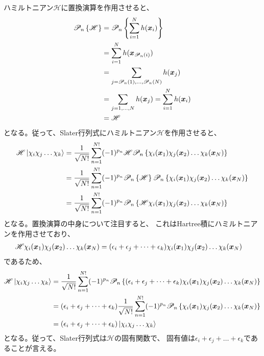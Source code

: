ハミルトニアン$\mathscr{H}$に置換演算を作用させると、
\begin{align}
	\mathscr{P}_n\left\{
		\mathscr{H}
	\right\}
&=
	\mathscr{P}_n\left\{
		\sum_{i=1}^{N} h(\x_i)
	\right\} \\
%
%
&=
	\sum_{i=1}^{N} h(\x_{\mathscr{P}_n(i)}) \\
%
%
&=
	\sum_{j=\mathscr{P}_n(1),\dots,\mathscr{P}_n(N)} h(\x_j) \\
%
%
&=
	\sum_{j=1,\dots,N} h(\x_j)
%
%
=
	\sum_{i=1}^{N} h(\x_i) \\
%
%
&=
	\mathscr{H}
\end{align}
となる。従って、Slater行列式にハミルトニアン$\mathscr{H}$を作用させると、
\begin{align}
	\mathscr{H}\ket{\chi_i\chi_j\dots\chi_k}
&=
	\frac{1}{\sqrt{N!}}
	\sum_{n=1}^{N!}
		(-1)^{p_n}
		\mathscr{H}
		\mathscr{P}_n\left\{
			\chi_i(\x_1) \chi_j(\x_2) \dots \chi_k(\x_N)
		\right\} \\
%
%
&=
	\frac{1}{\sqrt{N!}}
	\sum_{n=1}^{N!}
		(-1)^{p_n}
		\mathscr{P}_n\left\{
			\mathscr{H}
		\right\}
		\mathscr{P}_n\left\{
			\chi_i(\x_1) \chi_j(\x_2) \dots \chi_k(\x_N)
		\right\} \\
%
%
&=
	\frac{1}{\sqrt{N!}}
	\sum_{n=1}^{N!}
		(-1)^{p_n}
		\mathscr{P}_n\left\{
			\mathscr{H}
			\chi_i(\x_1) \chi_j(\x_2) \dots \chi_k(\x_N)
		\right\}
\end{align}
となる。置換演算の中身について注目すると、
これはHartree積にハミルトニアンを作用させており、
\begin{align}
	\mathscr{H}
	\chi_i({\bm{x}}_1) \chi_j({\bm{x}}_2) \dots \chi_k({\bm{x}}_N)
&=
	(\epsilon_i+\epsilon_j+\dots+\epsilon_k)
	\chi_i({\bm{x}}_1) \chi_j({\bm{x}}_2) \dots \chi_k({\bm{x}}_N)
\end{align}
であるため、
\begin{align}
	\mathscr{H}\ket{\chi_i\chi_j\dots\chi_k}
&=
	\frac{1}{\sqrt{N!}}
	\sum_{n=1}^{N!}
		(-1)^{p_n}
		\mathscr{P}_n\left\{
			(\epsilon_i+\epsilon_j+\dots+\epsilon_k)
			\chi_i(\x_1) \chi_j(\x_2) \dots \chi_k(\x_N)
		\right\} \\
%
%
&=
	(\epsilon_i+\epsilon_j+\dots+\epsilon_k)
	\frac{1}{\sqrt{N!}}
	\sum_{n=1}^{N!}
		(-1)^{p_n}
		\mathscr{P}_n\left\{
			\chi_i(\x_1) \chi_j(\x_2) \dots \chi_k(\x_N)
		\right\} \\
%
%
&=
	(\epsilon_i+\epsilon_j+\dots+\epsilon_k)
	\ket{\chi_i\chi_j\dots\chi_k}
\end{align}
となる。従って、Slater行列式は$\mathscr{H}$の固有関数で、
固有値は$\epsilon_i+\epsilon_j+\dots+\epsilon_k$であることが言える。









